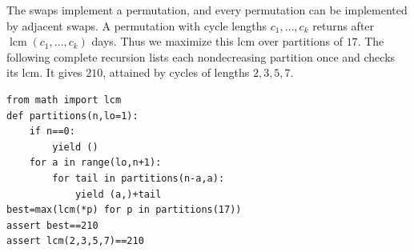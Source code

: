 The swaps implement a permutation, and every permutation can be implemented by adjacent swaps. A permutation with cycle lengths $c_1,\ldots,c_k$ returns after $\operatorname{lcm}(c_1,\ldots,c_k)$ days. Thus we maximize this lcm over partitions of $17$. The following complete recursion lists each nondecreasing partition once and checks its lcm. It gives $\boxed{210}$, attained by cycles of lengths $2,3,5,7$.
\begin{verbatim}
from math import lcm
def partitions(n,lo=1):
    if n==0:
        yield ()
    for a in range(lo,n+1):
        for tail in partitions(n-a,a):
            yield (a,)+tail
best=max(lcm(*p) for p in partitions(17))
assert best==210
assert lcm(2,3,5,7)==210
\end{verbatim}

